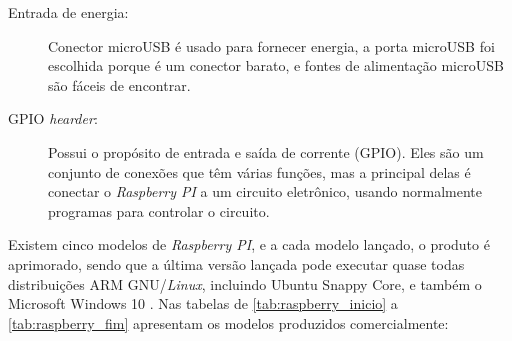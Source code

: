\documentclass[
	12pt,				%
	openright,			%
	twoside,			%
	a4paper,			%
	chapter=TITLE,		%
	english,			%
	brazil				%
	]{abntex2}
\begin{document}
\begin{description}
\item[Entrada de energia:] 
 Conector microUSB é usado para fornecer energia, a porta microUSB foi escolhida porque é um conector barato, e fontes de alimentação microUSB são fáceis de encontrar.

\item[GPIO \textit{hearder}:]
Possui o propósito de entrada e saída de corrente (GPIO). Eles são um conjunto de conexões que têm várias funções, mas a principal delas é conectar o \textit{Raspberry PI} a um circuito eletrônico, usando normalmente programas para controlar o circuito.


\end{description}

Existem cinco modelos de \textit{Raspberry PI}, e a cada modelo lançado, o produto é aprimorado, sendo que a última versão lançada pode executar quase todas distribuições ARM GNU/\textit{Linux}, incluindo Ubuntu Snappy Core, e também o Microsoft Windows 10 \cite{raspberrypi.org}. Nas tabelas de \ref{tab:raspberry_inicio} a \ref{tab:raspberry_fim} apresentam os modelos produzidos comercialmente:
\end{document}
